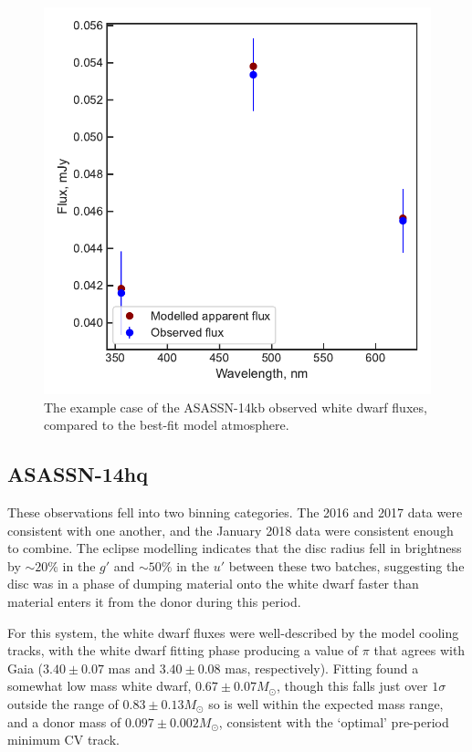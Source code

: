 \begin{figure}
    \centering
    \includegraphics[width=\textwidth]{figures/results/ASASSN-14kb/fluxplot.pdf}
    \caption{The example case of the ASASSN-14kb observed white dwarf fluxes, compared to the best-fit model atmosphere.}
    \label{fig:results:12 new CVs:ASASSN-14kb flux plot}
\end{figure}


\subsection{ASASSN-14hq}

These observations fell into two binning categories. The 2016 and 2017 data were consistent with one another, and the January 2018 data were consistent enough to combine. The eclipse modelling indicates that the disc radius fell in brightness by $\sim 20\%$ in the $g'$ and $\sim 50\%$ in the $u'$ between these two batches, suggesting the disc was in a phase of dumping material onto the white dwarf faster than material enters it from the donor during this period.

For this system, the white dwarf fluxes were well-described by the model cooling tracks, with the white dwarf fitting phase producing a value of $\pi$ that agrees with Gaia ($3.40\pm0.07$ mas and $3.40\pm0.08$ mas, respectively).
Fitting found a somewhat low mass white dwarf, $0.67 \pm 0.07 M_\odot$, though this falls just over $1\sigma$ outside the \citet{pala2020} range of $0.83\pm0.13 M_\odot$ so is well within the expected mass range, and a donor mass of $0.097\pm0.002 M_\odot$, consistent with the `optimal' pre-period minimum CV track.


